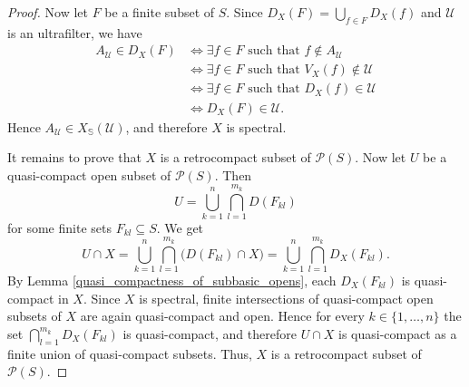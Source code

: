 \documentclass[10pt,a4paper]{amsart}
\begin{document}
\begin{proof}
    Now let $F$ be a finite subset of $S$. Since $D_X(F) = \bigcup_{f \in F} D_X(f)$ and $\mathscr{U}$ is an ultrafilter, we have
    \begin{align*} 
        A_\mathscr{U} \in D_X(F) &\iff \exists f \in F \text{ such that } f \not\in A_\mathscr{U} \\ &\iff \exists f \in F \text{ such that } V_X(f) \not\in\mathscr{U} \\ &\iff \exists f \in F \text{ such that } D_X(f) \in \mathscr{U} \\ &\iff  
        D_X(F) \in \mathscr{U}. 
    \end{align*} 
    Hence $A_\mathscr{U}\in X_\mathbb{S}(\mathscr{U})$, and therefore $X$ is spectral.
    
    It remains to prove that $X$ is a retrocompact subset of $\mathcal{P}(S)$. Now let $U$ be a quasi-compact open subset of $\mathcal{P}(S)$. Then $$U = \bigcup_{k = 1}^n \bigcap_{l = 1}^{m_k} D(F_{kl})$$ for some finite sets $F_{kl} \subseteq S$. We get 
    \begin{equation*}
        U \cap X = \bigcup_{k = 1}^n \bigcap_{l = 1}^{m_k} \big(D(F_{kl}) \cap X\big) = \bigcup_{k = 1}^n\bigcap_{l = 1}^{m_k} D_X(F_{kl}). 
    \end{equation*}
    By Lemma \ref{quasi_compactness_of_subbasic_opens}, each $D_X(F_{kl})$ is quasi-compact in $X$. Since $X$ is spectral, finite intersections of quasi-compact open subsets of $X$ are again quasi-compact and open. Hence for every $k \in \{1, \ldots, n\}$ the set $\bigcap_{l = 1}^{m_k} D_X(F_{kl})$ is quasi-compact, and therefore $U \cap X$ is quasi-compact as a finite union of quasi-compact subsets. Thus, $X$ is a retrocompact subset of $\mathcal{P}(S)$. 
\end{proof}
\end{document}
